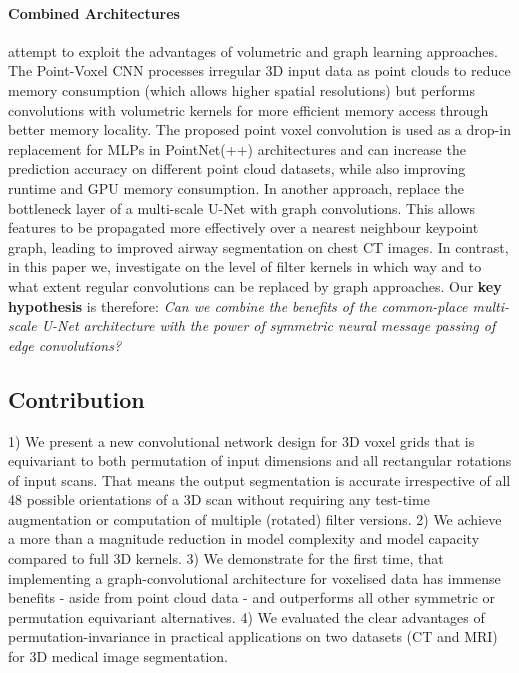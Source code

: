         \paragraph{Combined Architectures} attempt to exploit the advantages of volumetric and graph learning approaches. The Point-Voxel CNN \cite{liu2019point} processes irregular 3D input data as point clouds to reduce memory consumption (which allows higher spatial resolutions) but performs convolutions with volumetric kernels for more efficient memory access through better memory locality. The proposed point voxel convolution is used as a drop-in replacement for MLPs in PointNet(++) architectures and can increase the prediction accuracy on different point cloud datasets, while also improving runtime and GPU memory consumption. In another approach, \cite{garcia2019joint} replace the bottleneck layer of a multi-scale U-Net with graph convolutions. This allows features to be propagated more effectively over a nearest neighbour keypoint graph, leading to improved airway segmentation on chest CT images.
        In contrast, in this paper we, investigate on the level of filter kernels in which way and to what extent regular convolutions can be replaced by graph approaches. Our \textbf{key hypothesis} is therefore: \textit{Can we combine the benefits of the common-place multi-scale U-Net architecture with the power of symmetric neural message passing of edge convolutions?}

    \subsection{Contribution} 1) We present a new convolutional network design for 3D voxel grids that is equivariant to both permutation of input dimensions and all rectangular rotations of input scans. That means the output segmentation is accurate irrespective of all 48 possible orientations of a 3D scan without requiring any test-time augmentation or computation of multiple (rotated) filter versions. 2) We achieve a more than a magnitude reduction in model complexity and model capacity compared to full 3D kernels. 3)  We demonstrate for the first time, that implementing a graph-convolutional architecture for voxelised data has immense benefits - aside from point cloud data - and outperforms all other symmetric or permutation equivariant alternatives. 4) We evaluated the clear advantages of permutation-invariance in practical applications on two datasets (CT and MRI) for 3D medical image segmentation.



